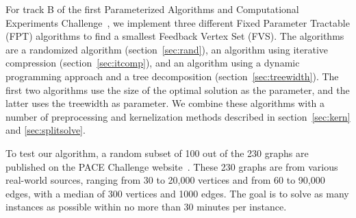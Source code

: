 For track B of the first Parameterized Algorithms and Computational Experiments Challenge~\cite{pace}, we implement three
different Fixed Parameter Tractable (FPT) algorithms to find a smallest Feedback Vertex Set (FVS). The algorithms are a
randomized algorithm (section~\ref{sec:rand}), an algorithm using iterative compression (section~\ref{sec:itcomp}), and an 
algorithm using a dynamic programming approach and a tree decomposition (section~\ref{sec:treewidth}). The first two
algorithms use the size of the optimal solution as the parameter, and the latter uses the treewidth as parameter. We
combine these algorithms with a number of preprocessing and kernelization methods described in section~\ref{sec:kern} and 
\ref{sec:splitsolve}.

To test our algorithm, a random subset of 100 out of the 230 graphs are published on the PACE Challenge
website~\cite{pace}. These 230 graphs are from various real-world sources, ranging from 30 to 20,000 vertices and from 60 to 90,000 edges, with a median of 300 vertices and 1000 edges. The goal is to solve as many instances as possible within no more than 30 minutes per instance.